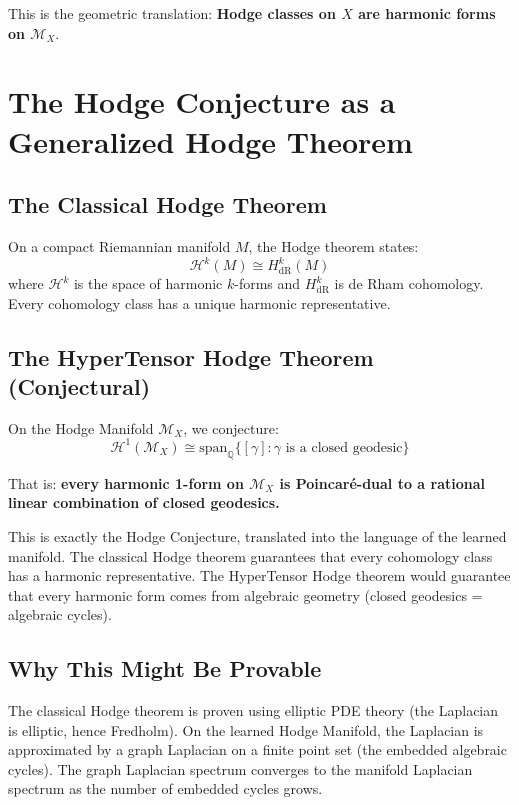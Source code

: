 \documentclass{article}
\begin{document}
This is the geometric translation: \textbf{Hodge classes on $X$ are harmonic
forms on $\mathcal{M}_X$}.

\section{The Hodge Conjecture as a Generalized Hodge Theorem}
\label{sec:hodge-geometric}

\subsection{The Classical Hodge Theorem}

On a compact Riemannian manifold $M$, the Hodge theorem states:
\begin{equation}
\mathcal{H}^k(M) \cong H^k_{\mathrm{dR}}(M)
\end{equation}
where $\mathcal{H}^k$ is the space of harmonic $k$-forms and
$H^k_{\mathrm{dR}}$ is de Rham cohomology.  Every cohomology class has a
unique harmonic representative.

\subsection{The HyperTensor Hodge Theorem (Conjectural)}

On the Hodge Manifold $\mathcal{M}_X$, we conjecture:
\begin{equation}
\mathcal{H}^1(\mathcal{M}_X) \cong \mathrm{span}_{\mathbb{Q}}\{[\gamma] :
\gamma \text{ is a closed geodesic}\}
\end{equation}

That is: \textbf{every harmonic 1-form on $\mathcal{M}_X$ is Poincar\'{e}-dual
to a rational linear combination of closed geodesics.}

This is exactly the Hodge Conjecture, translated into the language of the
learned manifold.  The classical Hodge theorem guarantees that every
cohomology class has a harmonic representative.  The HyperTensor Hodge
theorem would guarantee that every harmonic form comes from algebraic
geometry (closed geodesics = algebraic cycles).

\subsection{Why This Might Be Provable}

The classical Hodge theorem is proven using elliptic PDE theory (the
Laplacian is elliptic, hence Fredholm).  On the learned Hodge Manifold,
the Laplacian is approximated by a graph Laplacian on a finite point
set (the embedded algebraic cycles).  The graph Laplacian spectrum
converges to the manifold Laplacian spectrum as the number of embedded
cycles grows.
\end{document}
